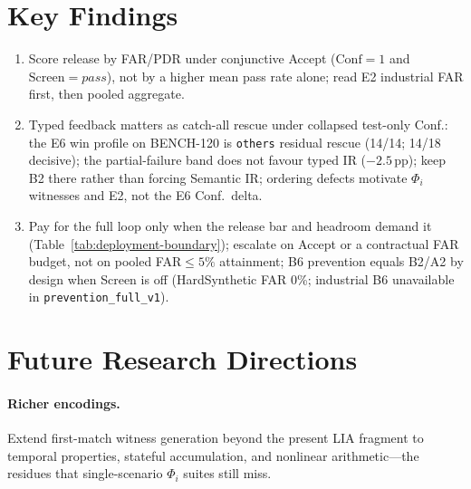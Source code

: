 \section{Key Findings}
\label{sec:conc:takeaways}
\label{sec:conc:remember}%

\begin{enumerate}
  \item Score release by FAR/PDR under conjunctive Accept
        ($\mathrm{Conf}{=}1$ and $\mathrm{Screen}{=}\mathit{pass}$), not by a
        higher mean pass rate alone; read E2 industrial FAR first, then pooled
        aggregate.
  \item Typed feedback matters as catch-all rescue under collapsed test-only
        Conf.: the E6 win profile on BENCH-120 is \texttt{others} residual
        rescue (14/14; 14/18 decisive); the partial-failure band does not
        favour typed IR (${-}2.5$\,pp); keep B2 there rather than forcing
        Semantic IR; ordering defects motivate $\Phi_i$ witnesses and E2,
        not the E6 Conf.\ delta.
  \item Pay for the full loop only when the release bar and headroom demand
        it (Table~\ref{tab:deployment-boundary}); escalate on Accept or a
        contractual FAR budget, not on pooled FAR${\le}5\%$ attainment;
        B6 prevention equals B2/A2 by design when Screen is off (HardSynthetic
        FAR 0\%; industrial B6 unavailable in \texttt{prevention\_full\_v1}).
\end{enumerate}


\section{Future Research Directions}
\label{sec:conc:future}

\paragraph{Richer encodings.}
Extend first-match witness generation beyond the present LIA fragment to
temporal properties, stateful accumulation, and nonlinear arithmetic---the
residues that single-scenario $\Phi_i$ suites still miss.


